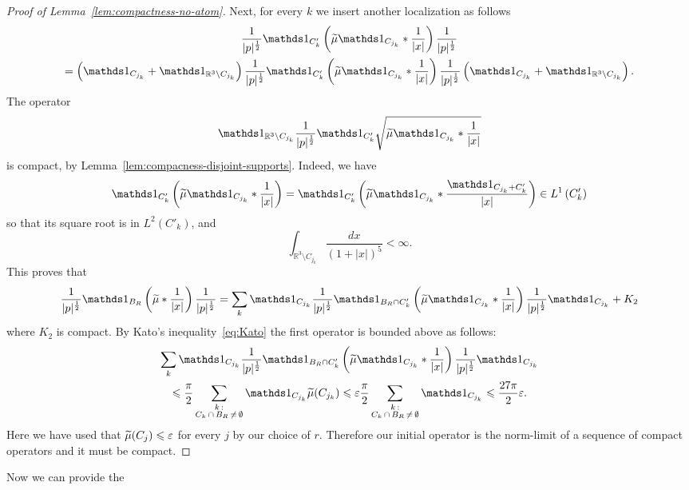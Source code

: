 \documentclass[10pt]{amsart}
\theoremstyle{definition}
\newcommand{\R}{\mathbb{R}}
\newcommand\1{{\ensuremath {\mathds 1} }}
\newcommand{\ii}{\infty}
\renewcommand{\leq}{\leqslant}
\renewcommand{\tilde}{\widetilde}
\newcommand{\eps}{\varepsilon}
\let\oldtilde\tilde
\renewcommand*{\tilde}[1]{\mathchoice{\widetilde{#1}}{\widetilde{#1}}{\oldtilde{#1}}{\oldtilde{#1}}}
\begin{document}
\begin{proof}[Proof of Lemma~\ref{lem:compactness-no-atom}]
Next, for every $k$ we insert another localization as follows
\begin{multline*}
\frac1{|p|^{\frac12}}\1_{C'_{k}}\left(\tilde\mu\1_{C_{j_k}}\ast\frac1{|x|}\right)\frac1{|p|^{\frac12}}\\
=\left(\1_{C_{j_k}}+\1_{\R^3\setminus C_{j_k}}\right)\frac1{|p|^{\frac12}}\1_{C'_{k}}\left(\tilde\mu\1_{C_{j_k}}\ast\frac1{|x|}\right)\frac1{|p|^{\frac12}} \left(\1_{C_{j_k}}+\1_{\R^3\setminus C_{j_k}}\right).
\end{multline*}
The operator
\[
\1_{\R^3\setminus C_{j_k}}\frac1{|p|^{\frac12}}\1_{C'_k}\sqrt{\tilde\mu\1_{C_{j_k}}\ast\frac1{|x|}}
\]
is compact, by Lemma~\ref{lem:compacness-disjoint-supports}. Indeed, we have
\[
\1_{C'_k}\left(\tilde\mu\1_{C_{j_k}}\ast\frac1{|x|}\right)=\1_{C'_k}\left(\tilde\mu\1_{C_{j_k}}\ast\frac{\1_{C_{j_k}+C'_k}}{|x|}\right)\in L^1\left(C'_k\right)
\]
so that its square root is in $L^2(C'_k)$, and
\[
\int_{\R^3\setminus C_{j_k}}\frac{dx}{(1+|x|)^{5}}<\ii.
\]
This proves that
\[
\frac1{|p|^{\frac12}}\1_{B_R}\left(\tilde\mu\ast\frac1{|x|}\right)\frac1{|p|^{\frac12}}=\sum_{k}\1_{C_{j_k}}\frac1{|p|^{\frac12}}\1_{B_R\cap C'_k}\left(\tilde\mu\1_{C_{j_k}}\ast\frac1{|x|}\right)\frac1{|p|^{\frac12}}\1_{C_{j_k}}+K_2
\]
where $K_2$ is compact. By Kato's inequality~\eqref{eq:Kato} the first operator is bounded above as follows:
\begin{multline*}
\sum_{k}\1_{C_{j_k}}\frac1{|p|^{\frac12}}\1_{B_R\cap C'_k}\left(\tilde\mu\1_{C_{j_k}}\ast\frac1{|x|}\right)\frac1{|p|^{\frac12}}\1_{C_{j_k}}\\
\leq \frac\pi2 \sum_{\substack{k\, :\\ C_k\,\cap\,B_R\,\neq\,\emptyset}}\1_{C_{j_k}}\tilde\mu(C_{j_k})\leq \eps\frac\pi2 \sum_{\substack{k\,:\\ C_k\,\cap\,B_R\,\neq\,\emptyset}}\1_{C_{j_k}}\leq \frac{27\pi}2 \eps.
\end{multline*}
Here we have used that $\tilde\mu(C_j)\leq\eps$ for every $j$ by our choice of $r$. Therefore our initial operator is the norm-limit of a sequence of compact operators and it must be compact.
\end{proof}

Now we can provide the
\end{document}
